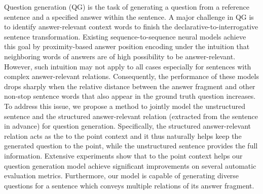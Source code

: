 Question generation (QG) is the task of generating a question from a reference sentence and a specified answer within the sentence. A major challenge in QG is to identify answer-relevant context words to finish the declarative-to-interrogative sentence transformation.
Existing sequence-to-sequence neural models achieve this goal by proximity-based answer position encoding under the intuition that neighboring words of answers are of high possibility to be answer-relevant. However, such intuition may not apply to all cases especially for sentences with complex answer-relevant relations. Consequently, the performance of these models drops sharply when the relative distance between the answer fragment and other non-stop sentence words that also appear in the ground truth question increases. To address this issue, we propose a method to jointly model the unstructured sentence and the structured answer-relevant relation (extracted from the sentence in advance) for question generation. Specifically, the structured answer-relevant relation acts as the to the point context and it thus naturally helps keep the generated question to the point, while the unstructured sentence provides the full information. Extensive experiments show that to the point context helps our question generation model achieve significant improvements on several automatic evaluation metrics. Furthermore, our model is capable of generating diverse questions for a sentence which conveys multiple relations of its answer fragment.